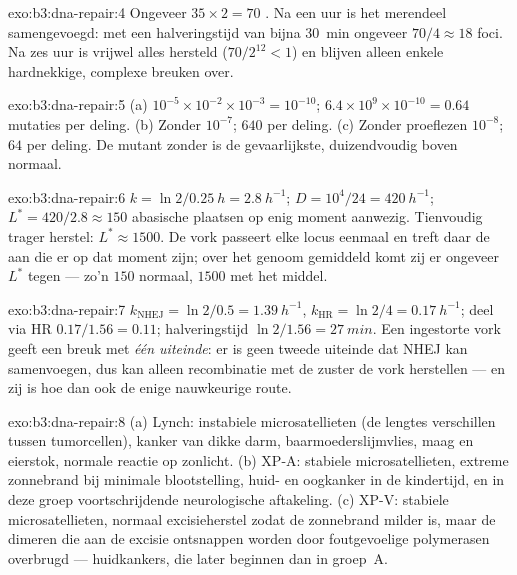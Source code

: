 \begin{solution}{exo:b3:dna-repair:4}
Ongeveer $35\times 2 = 70$ . Na een uur is het
merendeel samengevoegd: met een halveringstijd van bijna \qty{30}{min}
ongeveer $70/4 \approx 18$ foci. Na zes uur is vrijwel alles hersteld
($70/2^{12} < 1$) en blijven alleen enkele hardnekkige, complexe
breuken over.
\end{solution}

\begin{solution}{exo:b3:dna-repair:5}
(a) $10^{-5}\times 10^{-2}\times 10^{-3} = 10^{-10}$; $6.4\times
10^{9}\times 10^{-10} = 0.64$ mutaties per deling. (b) Zonder
 $10^{-7}$; $640$ per deling. (c) Zonder proeflezen
$10^{-8}$; $64$ per deling. De mutant zonder  is de
gevaarlijkste, duizendvoudig boven normaal.
\end{solution}

\begin{solution}{exo:b3:dna-repair:6}
$k = \ln 2/\qty{0.25}{h} = \qty{2.8}{h^{-1}}$; $D = 10^{4}/24 =
\qty{420}{h^{-1}}$; $L^{*} = 420/2.8 \approx 150$ abasische plaatsen op
enig moment aanwezig. Tienvoudig trager herstel: $L^{*} \approx \num{1500}$.
De vork passeert elke locus eenmaal en treft daar de  aan die er
op dat moment zijn; over het genoom gemiddeld komt zij er ongeveer
$L^{*}$ tegen --- zo'n $150$ normaal, $\num{1500}$ met het middel.
\end{solution}

\begin{solution}{exo:b3:dna-repair:7}
$k_{\text{NHEJ}} = \ln 2/0.5 = \qty{1.39}{h^{-1}}$, $k_{\text{HR}} =
\ln 2/4 = \qty{0.17}{h^{-1}}$; deel via HR $0.17/1.56 = 0.11$;
halveringstijd $\ln 2/1.56 = \qty{27}{min}$. Een ingestorte vork geeft
een breuk met \emph{één uiteinde}: er is geen tweede uiteinde dat NHEJ
kan samenvoegen, dus kan alleen recombinatie met de zuster de vork
herstellen --- en zij is hoe dan ook de enige nauwkeurige route.
\end{solution}

\begin{solution}{exo:b3:dna-repair:8}
(a) Lynch: instabiele microsatellieten (de lengtes verschillen tussen
tumorcellen), kanker van dikke darm, baarmoederslijmvlies, maag en
eierstok, normale reactie op zonlicht. (b) XP-A: stabiele
microsatellieten, extreme zonnebrand bij minimale blootstelling, huid-
en oogkanker in de kindertijd, en in deze groep voortschrijdende
neurologische aftakeling. (c) XP-V: stabiele microsatellieten, normaal
excisieherstel zodat de zonnebrand milder is, maar de dimeren die aan
de excisie ontsnappen worden door foutgevoelige polymerasen overbrugd
--- huidkankers, die later beginnen dan in groep~A.
\end{solution}

